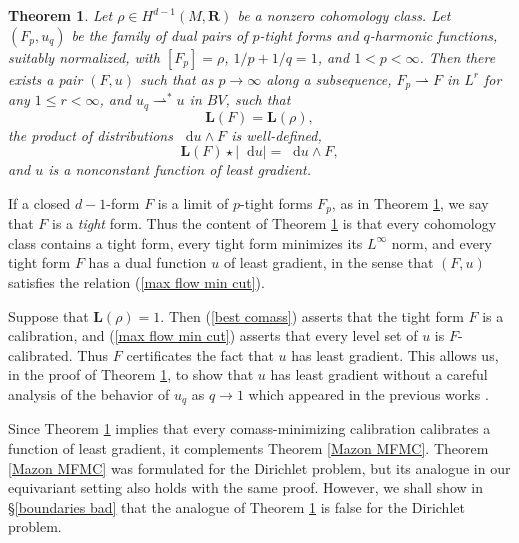 \documentclass[reqno,11pt]{amsart}
\newcommand{\RR}{\mathbf{R}}
\newcommand*\dif{\mathop{}\!\mathrm{d}}
\newcommand{\weakto}{\rightharpoonup}
\newcommand{\Comass}{\mathbf L}
\newcommand{\dfn}[1]{\emph{#1}\index{#1}}
\newtheorem{mainthm}{Theorem}
\theoremstyle{definition}
\numberwithin{equation}{section}
\begin{document}
\begin{mainthm}\label{existence of infinity tight forms}
Let $\rho \in H^{d - 1}(M, \RR)$ be a nonzero cohomology class.
Let $(F_p, u_q)$ be the family of dual pairs of $p$-tight forms and $q$-harmonic functions, suitably normalized, with $[F_p] = \rho$, $1/p + 1/q = 1$, and $1 < p < \infty$.
Then there exists a pair $(F, u)$ such that as $p \to \infty$ along a subsequence, $F_p \weakto F$ in $L^r$ for any $1 \leq r < \infty$, and $u_q \weakto^* u$ in $BV$, such that
\begin{equation}\label{best comass}
\Comass(F) = \Comass(\rho),
\end{equation}
the product of distributions $\dif u \wedge F$ is well-defined,
\begin{equation}\label{max flow min cut}
\Comass(F) \star |\dif u| = \dif u \wedge F,
\end{equation}
and $u$ is a nonconstant function of least gradient.
\end{mainthm}

If a closed $d - 1$-form $F$ is a limit of $p$-tight forms $F_p$, as in Theorem \ref{existence of infinity tight forms}, we say that $F$ is a \dfn{tight} form.
Thus the content of Theorem \ref{existence of infinity tight forms} is that every cohomology class contains a tight form, every tight form minimizes its $L^\infty$ norm, and every tight form $F$ has a dual function $u$ of least gradient, in the sense that $(F, u)$ satisfies the relation (\ref{max flow min cut}).

Suppose that $\Comass(\rho) = 1$.
Then (\ref{best comass}) asserts that the tight form $F$ is a calibration, and (\ref{max flow min cut}) asserts that every level set of $u$ is $F$-calibrated.
Thus $F$ certificates the fact that $u$ has least gradient.
This allows us, in the proof of Theorem \ref{existence of infinity tight forms}, to show that $u$ has least gradient without a careful analysis of the behavior of $u_q$ as $q \to 1$ which appeared in the previous works \cite{daskalopoulos2020transverse,daskalopoulos2022}.

Since Theorem \ref{existence of infinity tight forms} implies that every comass-minimizing calibration calibrates a function of least gradient, it complements Theorem \ref{Mazon MFMC}.
Theorem \ref{Mazon MFMC} was formulated for the Dirichlet problem, but its analogue in our equivariant setting also holds with the same proof.
However, we shall show in \S\ref{boundaries bad} that the analogue of Theorem \ref{existence of infinity tight forms} is false for the Dirichlet problem.
\end{document}
